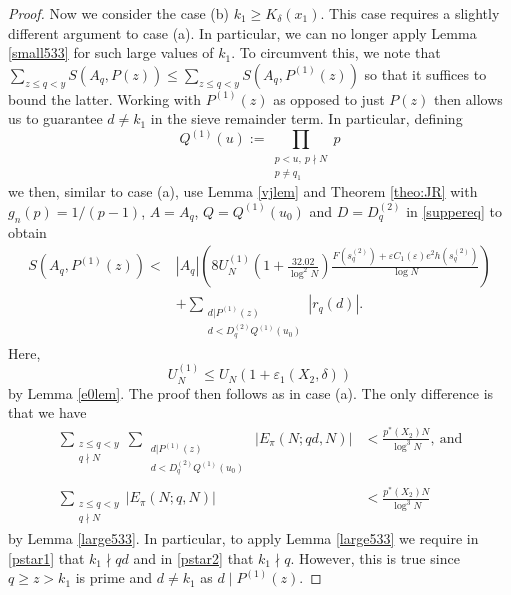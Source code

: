 \documentclass[12pt]{amsart}
\begin{document}
\begin{proof}
Now we consider the case (b) $k_1\ge K_{\delta}(x_1)$. This case requires a slightly different argument to case (a). In particular, we can no longer apply Lemma \ref{small533} for such large values of $k_1$. To circumvent this, we note that $\sum_{z \le q < y} S(A_q,P(z))\le \sum_{z \le q < y} S(A_q,P^{(1)}(z))$ so that it suffices to bound the latter. Working with $P^{(1)}(z)$ as opposed to just $P(z)$ then allows us to guarantee $d\neq k_1$ in the sieve remainder term. In particular, defining
\begin{equation}\label{Q1eq}
    Q^{(1)}(u):=\prod_{\substack{p< u,\ p\nmid N \\ p\neq q_1}}p
\end{equation}
we then, similar to case (a), use Lemma \ref{vjlem} and Theorem \ref{theo:JR} with $g_n(p)=1/(p-1)$, $A=A_q$, $Q=Q^{(1)}(u_0)$ and $D=D^{(2)}_q$ in \eqref{suppereq} to obtain
\begin{align*}
    S(A_q,P^{(1)}(z))<&\left|A_q\right|\left(8U_N^{(1)}\left( 1+\frac{32.02}{\log^2 N}\right)\frac{ F(s^{(2)}_q)+\varepsilon C_{1}(\varepsilon) e^2 h(s^{(2)}_q)}{\log N}\right) \\ &+\sum_{\substack{d|P^{(1)}(z)\\d<D^{(2)}_qQ^{(1)}(u_0)}}\left|r_{q} (d)\right|.
\end{align*}
Here,
\begin{equation*}
    U_N^{(1)}\le U_N(1+\varepsilon_1(X_2,\delta))
\end{equation*}
by Lemma \ref{e0lem}. The proof then follows as in case (a). The only difference is that we have
\begin{align}
    \sum_{\substack{z \le q < y\\q\nmid N}}\sum_{\substack{\substack{d|P^{(1)}(z)\\d<D^{(2)}_qQ^{(1)}(u_0)}}}\left|E_{\pi}(N;qd,N)\right| &< \frac{p^*(X_2)N}{\log^3 N},\ \text{and}\label{pstar1}\\
    \sum_{\substack{z \le q < y\\q\nmid N}} |E_{\pi}(N;q,N)|&<\frac{p^*(X_2)N}{\log^3N}\label{pstar2}
\end{align}
by Lemma \ref{large533}. In particular, to apply Lemma \ref{large533} we require in \eqref{pstar1} that $k_1\nmid qd$ and in \eqref{pstar2} that $k_1\nmid q$. However, this is true since $q\ge z>k_1$ is prime and $d\neq k_1$ as $d\mid P^{(1)}(z)$.
\end{proof}
\end{document}
